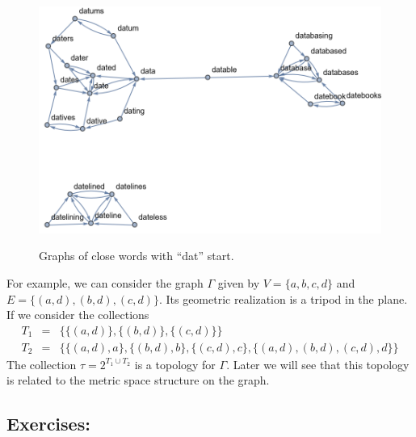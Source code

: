 \documentclass[
	fontsize=10pt, %
	twoside=false, %
	secnumdepth=1, %
]{kaobook}
\begin{document}
\begin{example}
\begin{figure}[h]
\includegraphics[scale=0.5]{Graph_Close_Words.png}
\label{C1:Fig:Wordgraph}
\caption{Graphs of close words with ``dat'' start.}
\end{figure}

For example, we can consider the graph $\Gamma$ given by $V=\{a,b,c,d\}$ and $E=\{(a,d),(b,d),(c,d)\}.$ Its geometric realization is a tripod in the plane. If we consider the collections
\begin{eqnarray*}
T_1 & =& \{\{(a,d)\},\{(b,d)\},\{(c,d)\}\} \\
T_2 & = &\{\{(a,d),a\},\{(b,d),b\},\{(c,d),c\},\{(a,d),(b,d),(c,d),d\}\}
\end{eqnarray*}
The collection $\tau=2^{T_1\cup T_2}$ is a topology for $\Gamma.$ Later we will see that this topology is related to the metric space structure on the graph.
\end{example}



\subsection{Exercises:}
\end{document}
